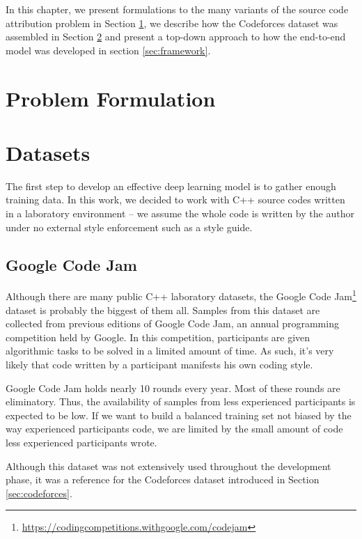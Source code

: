 
In this chapter, we present formulations to the many variants of the source code attribution problem in Section \ref{sec:formulations}, we describe how the Codeforces dataset was assembled in Section \ref{sec:dataset} and present a top-down approach to how the end-to-end model was developed in section \ref{sec:framework}.

\section{Problem Formulation}\label{sec:formulations}
\section{Datasets}\label{sec:dataset}

The first step to develop an effective deep learning model is to gather enough training data. In this work, we decided to work with C++ source codes written in a laboratory environment -- we assume the whole code is written by the author under no external style enforcement such as a style guide.

\subsection{Google Code Jam}

Although there are many public C++ laboratory datasets, the Google Code Jam\footnote{\url{https://codingcompetitions.withgoogle.com/codejam}} dataset \cite{caliskan_2015} is probably the biggest of them all. Samples from this dataset are collected from previous editions of Google Code Jam, an annual programming competition held by Google. In this competition, participants are given algorithmic tasks to be solved in a limited amount of time. As such, it's very likely that code written by a participant manifests his own coding style.

Google Code Jam holds nearly 10 rounds every year. Most of these rounds are eliminatory. Thus, the availability of samples from less experienced participants is expected to be low. If we want to build a balanced training set not biased by the way experienced participants code, we are limited by the small amount of code less experienced participants wrote.

Although this dataset was not extensively used throughout the development phase, it was a reference for the Codeforces dataset introduced in Section \ref{sec:codeforces}.

